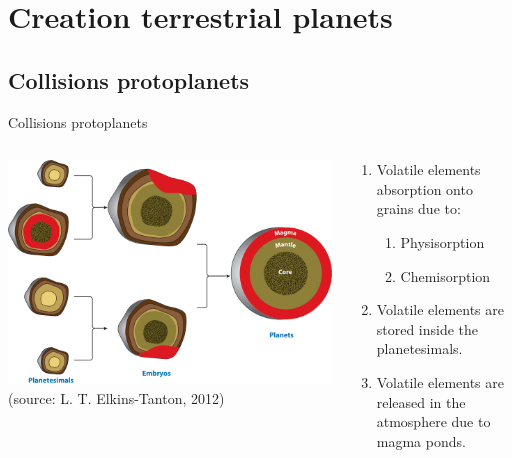 \documentclass[11pt, aspectratio=169]{beamer}
\begin{document}
\section{Creation terrestrial planets}
\subsection{Collisions protoplanets}
\begin{frame}[t]{Collisions protoplanets}
	\begin{columns}
	\begin{column}{0.5\textwidth}
		\centering
		\vspace{-1cm}
     	\includegraphics[height=.73\textheight]{figures/protoplanets.png} \\
     	\small (source: L. T. Elkins-Tanton, 2012)
	\end{column}
	\begin{column}{0.5\textwidth}
	\begin{enumerate}
		\item Volatile elements absorption onto grains due to:
		\begin{enumerate}
			\item Physisorption\\
			\item Chemisorption\\
		\end{enumerate}
		\item Volatile elements are stored inside the planetesimals.\\
		\item Volatile elements are released in the atmosphere due to magma ponds.\\
	\end{enumerate}
	\vspace{3cm}
	\end{column}
	\end{columns}	
\end{frame}
\end{document}
